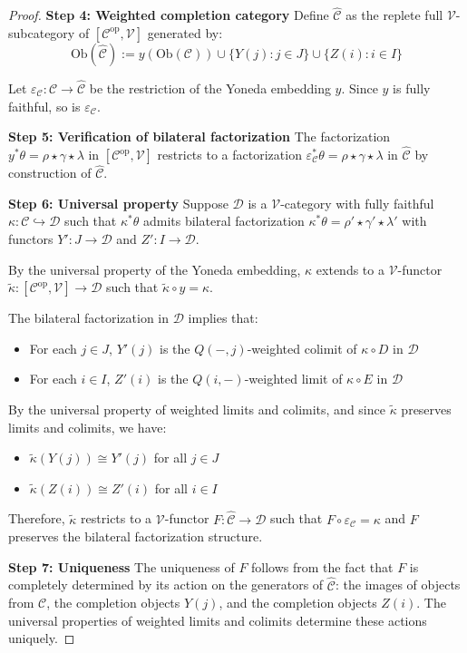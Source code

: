 \documentclass[11pt]{article}
\theoremstyle{plain}
\theoremstyle{definition}
\theoremstyle{remark}
\newcommand{\V}{\mathcal{V}}
\newcommand{\C}{\mathcal{C}}
\newcommand{\op}{\mathrm{op}}
\newcommand{\wh}[1]{\widehat{#1}}
\newcommand{\wt}[1]{\widetilde{#1}}
\begin{document}
\begin{proof}
\textbf{Step 4: Weighted completion category} 
Define $\wh{\C}$ as the replete full $\V$-subcategory of $[\C^{\op}, \V]$ generated by:
$$\mathrm{Ob}(\wh{\C}) := y(\mathrm{Ob}(\C)) \cup \{Y(j) : j \in J\} \cup \{Z(i) : i \in I\}$$

Let $\varepsilon_\C : \C \to \wh{\C}$ be the restriction of the Yoneda embedding $y$. Since $y$ is fully faithful, so is $\varepsilon_\C$.

\textbf{Step 5: Verification of bilateral factorization}
The factorization $y^* \theta = \rho \star \gamma \star \lambda$ in $[\C^{\op}, \V]$ restricts to a factorization $\varepsilon_\C^* \theta = \rho \star \gamma \star \lambda$ in $\wh{\C}$ by construction of $\wh{\C}$.

\textbf{Step 6: Universal property}
Suppose $\mathcal{D}$ is a $\V$-category with fully faithful $\kappa : \mathcal{C} \hookrightarrow \mathcal{D}$ such that $\kappa^* \theta$ admits bilateral factorization $\kappa^* \theta = \rho' \star \gamma' \star \lambda'$ with functors $Y' : J \to \mathcal{D}$ and $Z' : I \to \mathcal{D}$.

By the universal property of the Yoneda embedding, $\kappa$ extends to a $\V$-functor $\wt{\kappa} : [\C^{\op}, \V] \to \mathcal{D}$ such that $\wt{\kappa} \circ y = \kappa$.

The bilateral factorization in $\mathcal{D}$ implies that:
\begin{itemize}
\item For each $j \in J$, $Y'(j)$ is the $Q(-, j)$-weighted colimit of $\kappa \circ D$ in $\mathcal{D}$
\item For each $i \in I$, $Z'(i)$ is the $Q(i, -)$-weighted limit of $\kappa \circ E$ in $\mathcal{D}$
\end{itemize}

By the universal property of weighted limits and colimits, and since $\wt{\kappa}$ preserves limits and colimits, we have:
\begin{itemize}
\item $\wt{\kappa}(Y(j)) \cong Y'(j)$ for all $j \in J$
\item $\wt{\kappa}(Z(i)) \cong Z'(i)$ for all $i \in I$
\end{itemize}

Therefore, $\wt{\kappa}$ restricts to a $\V$-functor $F : \wh{\C} \to \mathcal{D}$ such that $F \circ \varepsilon_\C = \kappa$ and $F$ preserves the bilateral factorization structure.

\textbf{Step 7: Uniqueness}
The uniqueness of $F$ follows from the fact that $F$ is completely determined by its action on the generators of $\wh{\C}$: the images of objects from $\C$, the completion objects $Y(j)$, and the completion objects $Z(i)$. The universal properties of weighted limits and colimits determine these actions uniquely.


\end{proof}
\end{document}
